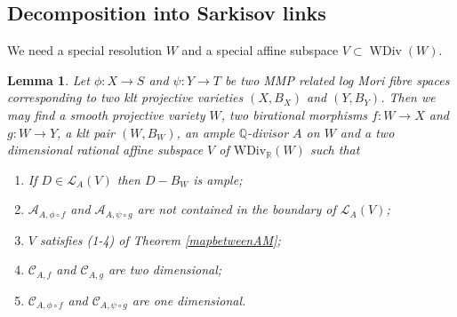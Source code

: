 \documentclass[11pt]{amsart}
\newtheorem{lem}[defn]{Lemma}
\begin{document}
\subsection{Decomposition into Sarkisov links}
We need a special resolution $W$ and a special  affine subspace $V \subset \operatorname{WDiv}(W)$.

\begin{lem}\label{keylemma}
  \cite[Lemma 4.1]{haconSarkisovProgram2012} Let $ \phi:X\to S $ and $ \psi :Y\to T  $ be two MMP related log Mori fibre spaces corresponding to two klt projective varieties $ (X,B_X) $ and $ (Y,B_Y) $. Then we may find a smooth projective variety $ W $, two birational morphisms $ f:W\to X $ and $ g:W\to Y $, a klt pair $ (W,B_{W}) $, an ample $ \mathbb{Q} $-divisor $ A $ on $ W $ and a two dimensional rational affine subspace $ V $ of $ \mathrm{WDiv}_\mathbb{R}(W) $ such that 
  \begin{enumerate}
    \item If $ D\in \mathcal{L}_A(V) $ then $ D-B_W $ is ample;
    \item $ \mathcal{A}_{A,\phi\circ f} $ and $ \mathcal{A}_{A,\psi\circ g} $ are not contained in the boundary of $ \mathcal{L}_A(V) $;
    \item $ V $ satisfies (1-4) of Theorem \ref{mapbetweenAM};
    \item $ \mathcal{C}_{A,f} $ and $ \mathcal{C}_{A,g} $ are two dimensional;
    \item $ \mathcal{C}_{A,\phi\circ f} $ and $ \mathcal{C}_{A,\psi\circ g} $ are one dimensional.
  \end{enumerate}
\end{lem}
\end{document}
